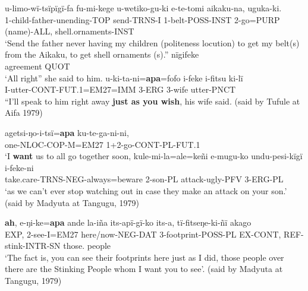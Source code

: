 \documentclass[output=paper]{langsci/langscibook}
\begin{document}
\begin{exe}
\ex \label{ex:eb66}
	\begin{xlist}
	\ex \label{ex:eb66a}
	\gll u-limo-wï-tsïpïgï-fa fu-mi-kege u-wetiko-gu-ki e-te-tomi aikaku-na, uguka-ki.\\
	1-child-father-unending-TOP send-TRNS-I 1-belt-POSS-INST 2-go=PURP (name)-ALL, shell.ornaments-INST\\
	\trans ‘Send the father never having my children (politeness locution)  to get my belt(s) from the  Aikaku, to get shell ornaments (s).” 
	\ex \label{ex:eb66b}
	 nïgifeke\\
	agreement QUOT\\
	\trans ‘All right” she said to him.
	\ex \label{ex:eb66c}
	\gll u-ki-ta-ni=\textbf{apa}=fofo i-feke i-fitsu ki-lï\\
	I-utter-CONT-FUT.1=EM27=IMM 3-ERG 3-wife utter-PNCT\\
	\trans “I’ll speak to him right away \textbf{just as you wish}, his wife said. (said by Tufule at Aifa 1979) 
\end{xlist}
\end{exe}

\begin{exe}
\ex \label{ex:eb67}
	\begin{xlist}
	\ex 
	\gll agetsi-ŋo-i-tsï=\textbf{apa} ku-te-ga-ni-ni,\\
	one-NLOC-COP-M=EM27 1+2-go-CONT-PL-FUT.1\\
	\trans ‘I \textbf{want} us to all go together soon,
	\ex 
	\gll kule-mi-la=ale=keñi e-mugu-ko undu-pesi-kïgï i-feke-ni\\
	take.care-TRNS-NEG-always=beware 2-son-PL attack-ugly-PFV 3-ERG-PL\\
	\trans ‘as we can’t ever stop watching out in case they make an attack on your son.’ (said by Madyuta at Tangugu, 1979)
\end{xlist}
\end{exe}

\begin{exe}
	\ex \label{ex:eb68}
	\gll \textbf{ah}, e-ŋi-ke=\textbf{apa} ande la-iña its-apï-gï-ko its-a, tï-fitseŋe-ki-ñï akago\\
	EXP, 2-see-I=EM27 here/now-NEG-DAT 3-footprint-POSS-PL EX-CONT, REF-stink-INTR-SN  those. people\\
	\trans ‘The fact is, you can see their footprints here just as I did,  those people over there are the  Stinking People whom I want you to see’. (said by Madyuta at Tangugu, 1979)
\end{exe}
\end{document}
